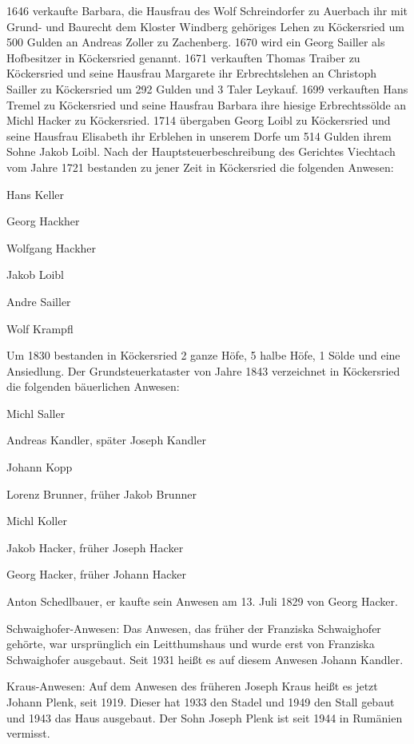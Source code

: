 \documentclass{book}
\begin{document}
1646 verkaufte Barbara, die Hausfrau des Wolf Schreindorfer zu Auerbach ihr mit
Grund- und Baurecht dem Kloster Windberg gehöriges Lehen zu Köckersried um 500
Gulden an Andreas Zoller zu Zachenberg. 1670 wird ein Georg Sailler als
Hofbesitzer in Köckersried genannt. 1671 verkauften Thomas Traiber zu
Köckersried und seine Hausfrau Margarete ihr Erbrechtslehen an Christoph Sailler
zu Köckersried um 292 Gulden und 3 Taler Leykauf. 1699 verkauften Hans Tremel zu
Köckersried und seine Hausfrau Barbara ihre hiesige Erbrechtssölde an Michl
Hacker zu Köckersried. 1714 übergaben Georg Loibl zu Köckersried und seine
Hausfrau Elisabeth ihr Erblehen in unserem Dorfe um 514 Gulden ihrem Sohne Jakob
Loibl. Nach der Hauptsteuerbeschreibung des Gerichtes Viechtach vom Jahre 1721
bestanden zu jener Zeit in Köckersried die folgenden Anwesen:



Hans Keller

Georg Hackher

Wolfgang Hackher

Jakob Loibl

Andre Sailler

Wolf Krampfl



Um 1830 bestanden in Köckersried 2 ganze Höfe, 5 halbe Höfe, 1 Sölde und eine
Ansiedlung. Der Grundsteuerkataster von Jahre 1843 verzeichnet in Köckersried
die folgenden bäuerlichen Anwesen:



Michl Saller

Andreas Kandler, später Joseph Kandler

Johann Kopp

Lorenz Brunner, früher Jakob Brunner

Michl Koller

Jakob Hacker, früher Joseph Hacker

Georg Hacker, früher Johann Hacker

Anton Schedlbauer, er kaufte sein Anwesen am 13. Juli 1829 von Georg Hacker.



Schwaighofer-Anwesen: Das Anwesen, das früher der Franziska Schwaighofer
gehörte, war ursprünglich ein Leitthumshaus und wurde erst von Franziska
Schwaighofer ausgebaut. Seit 1931 heißt es auf diesem Anwesen Johann Kandler.

Kraus-Anwesen: Auf dem Anwesen des früheren Joseph Kraus heißt es jetzt Johann
Plenk, seit 1919. Dieser hat 1933 den Stadel und 1949 den Stall gebaut und 1943
das Haus ausgebaut. Der Sohn Joseph Plenk ist seit 1944 in Rumänien vermisst.
\end{document}
